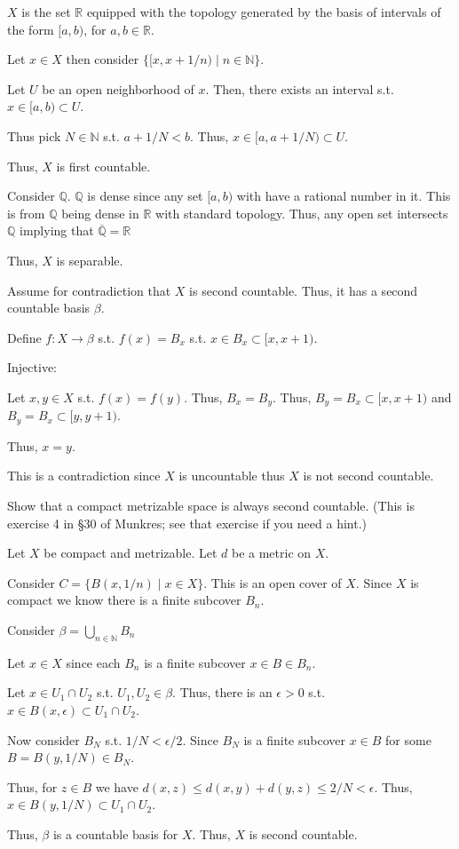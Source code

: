 \documentclass[12pt, letterpaper]{article}
\newcommand{\R}{\mathbb{R}}
\newcommand{\Q}{\mathbb{Q}}
\newcommand{\N}{\mathbb{N}}
\begin{document}
\begin{subproblem}{}
    $X$ is the set $\R$ equipped with the topology generated by
    the basis of intervals of the form $[a, b)$, for $a, b \in \R$.
\end{subproblem}
\begin{problemproof}
    Let $x \in X$ then consider $\{[x,x+1/n) \mid n \in \N\}$.

    Let $U$ be an open neighborhood of $x$. Then, there exists an interval s.t. $x \in [a,b) \subset U$.

    Thus pick $N \in \N$ s.t. $a+1/N < b$. Thus, $x \in [a,a+1/N) \subset U$.

    Thus, $X$ is first countable.

    Consider $\Q$. $\Q$ is dense since any set $[a,b)$ with have a rational number in it. This is from $\Q$ being dense in $\R$ with standard topology. Thus, any open set intersects $\Q$ implying that $\overline{\Q}=\R$

    Thus, $X$ is separable.

    Assume for contradiction that $X$ is second countable. Thus, it has a second countable basis $\beta$.

    Define $f : X \to \beta$ s.t. $f(x)=B_x$ s.t. $x \in B_x \subset [x,x+1)$.

    Injective:

    Let $x,y \in X$ s.t. $f(x)=f(y)$. Thus, $B_x=B_y$. Thus, $B_y=B_x \subset [x,x+1)$ and $B_y=B_x \subset [y,y+1)$.

    Thus, $x=y$.

    This is a contradiction since $X$ is uncountable thus $X$ is not second countable.
\end{problemproof}

\begin{problem}{}
    Show that a compact metrizable space is always second
  countable. (This is exercise 4 in \S30 of Munkres; see that exercise
  if you need a hint.)
\end{problem}
\begin{problemproof}
    Let $X$ be compact and metrizable. Let $d$ be a metric on $X$.

    Consider $C=\{B(x,1/n) \mid x \in X\}$. This is an open cover of $X$. Since $X$ is compact we know there is a finite subcover $B_n$.

    Consider $\beta=\displaystyle\bigcup_{n \in \N}B_n$

    Let $x \in X$ since each $B_n$ is a finite subcover $x \in B \in B_n$.

    Let $x \in U_1 \cap U_2$ s.t. $U_1,U_2 \in \beta$. Thus, there is an $\epsilon > 0$ s.t. $x \in B(x,\epsilon) \subset U_1 \cap U_2$.

    Now consider $B_N$ s.t. $1/N < \epsilon/2$. Since $B_N$ is a finite subcover $x \in B$ for some $B=B(y,1/N) \in B_N$.

    Thus, for $z \in B$ we have $d(x,z) \leq d(x,y) + d(y,z) \leq 2/N < \epsilon$. Thus, $x \in B(y,1/N) \subset U_1 \cap U_2$.

    Thus, $\beta$ is a countable basis for $X$. Thus, $X$ is second countable.
\end{problemproof}
\end{document}
